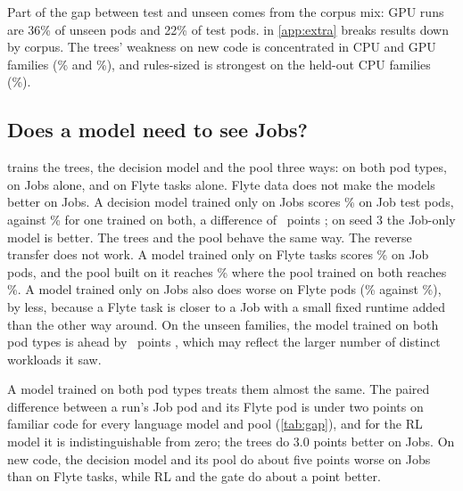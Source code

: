 Part of the gap between test and unseen comes from the corpus mix: GPU runs are 36\% of unseen pods and 22\% of
test pods.  in \cref{app:extra} breaks results down by corpus. The trees' weakness on new code is
concentrated in CPU and GPU families (\cUnseenCpuTrees\% and \cUnseenGpuTrees\%), and rules-sized is strongest on the
held-out CPU families (\cUnseenCpuSized\%).

\subsection{Does a model need to see Jobs?}
\label{sec:res-training}

 trains the trees, the decision model and the pool three ways: on both pod types, on Jobs alone,
and on Flyte tasks alone. Flyte data does not make the models better on Jobs. A decision model trained only on Jobs
scores \rTestDecJob\% on Job test pods, against \rTestDec\% for one trained on both, a difference of
\diffTestDecDecJob\ points \diffTestDecDecJobCI; on seed 3 the Job-only model is better. The trees and the pool
behave the same way. The reverse transfer does not work. A model trained only on Flyte tasks scores \rTestDecFlyte\%
on Job pods, and the pool built on it reaches \rTestPoolDecFlyte\% where the pool trained on both reaches
\rTestPoolDec\%. A model trained only on Jobs also does worse on Flyte pods (\rFTestDecJob\% against \rFTestDec\%),
by less, because a Flyte task is closer to a Job with a small fixed runtime added than the other way around. On the
unseen families, the model trained on both pod types is ahead by \diffUnseenDecDecJob\ points
\diffUnseenDecDecJobCI, which may reflect the larger number of distinct workloads it saw.

\begin{table}[tbp]
\centering\small
\caption{What the training data includes. Regret (\%) on Job and Flyte pods, and the share of Job pods whose first
attempt succeeds, for seed 1.}
\label{tab:training}

\end{table}

A model trained on both pod types treats them almost the same. The paired difference between a run's Job pod and
its Flyte pod is under two points on familiar code for every language model and pool (\cref{tab:gap}), and for the
RL model it is indistinguishable from zero; the trees do 3.0 points better on Jobs. On new code, the decision model and
its pool do about five points worse on Jobs than on Flyte tasks, while RL and the gate do about a point better.

